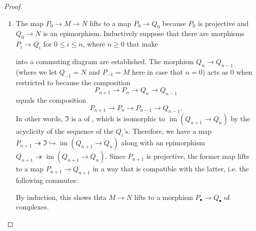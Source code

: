 \begin{proof}
    \begin{enumerate}
        \item The map $P_0 \to M \to N$ lifts to a map $P_0 \to Q_0$ because $P_0$ is projective and $Q_0 \to N$ is an epimorphism. 
        Inductively suppose that there are morphisms $P_i \to Q_i$ for $0 \leq i \leq n$, where $n \geq 0$ that make 
        \begin{center}
        \end{center}
        into a commuting diagram are established. The morphism $Q_{n} \to Q_{n-1}$ (where we let $Q_{-1} = N$ and $P_{-1} = M$ here in case that $n = 0$) acts as $0$ when restricted to  because the composition 
        $$P_{n+1} \to P_n \to Q_n \to Q_{n-1}$$
        equals the composition 
        $$P_{n+1} \to P_n \to P_{n-1} \to Q_{n-1}.$$
        In other words, $\mathfrak{I}$ is a  of , which is isomorphic to $\operatorname{im}(Q_{n+1} \to Q_n)$ by the acyclicity of the sequence of the $Q_i$'s. Therefore, we have a map $P_{n+1} \twoheadrightarrow \mathfrak{I}\hookrightarrow \operatorname{im}(Q_{n+1} \to Q_n)$ along with an epimorphism $Q_{n+1} \twoheadrightarrow \operatorname{im}(Q_{n+1} \to Q_n)$. Since $P_{n+1}$ is projective, the former map lifts to a map $P_{n+1} \to Q_{n+1}$ in a way that is compatible with the latter, i.e. the following commutes:
        \begin{center}
        \end{center}
        By induction, this shows thta $M \to N$ lifts to a morphism $P_\bullet \to Q_\bullet$ of complexes.


\end{enumerate}
\end{proof}
